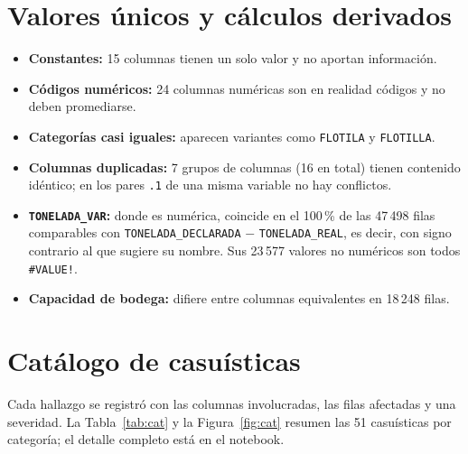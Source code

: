 \documentclass[11pt,a4paper]{article}
\begin{document}
\section{Valores únicos y cálculos derivados}

\begin{itemize}
  \item \textbf{Constantes:} 15 columnas tienen un solo valor y no aportan información.
  \item \textbf{Códigos numéricos:} 24 columnas numéricas son en realidad códigos y no deben promediarse.
  \item \textbf{Categorías casi iguales:} aparecen variantes como \texttt{FLOTILA} y \texttt{FLOTILLA}.
  \item \textbf{Columnas duplicadas:} 7 grupos de columnas (16 en total) tienen contenido idéntico; en los pares \texttt{.1} de una misma variable no hay conflictos.
  \item \textbf{\texttt{TONELADA\_VAR}:} donde es numérica, coincide en el 100\,\% de las 47\,498 filas comparables con \texttt{TONELADA\_DECLARADA} $-$ \texttt{TONELADA\_REAL}, es decir, con signo contrario al que sugiere su nombre. Sus 23\,577 valores no numéricos son todos \texttt{\#VALUE!}.
  \item \textbf{Capacidad de bodega:} difiere entre columnas equivalentes en 18\,248 filas.
\end{itemize}

\section{Catálogo de casuísticas}

Cada hallazgo se registró con las columnas involucradas, las filas afectadas y una severidad. La Tabla~\ref{tab:cat} y la Figura~\ref{fig:cat} resumen las 51 casuísticas por categoría; el detalle completo está en el notebook.
\end{document}
